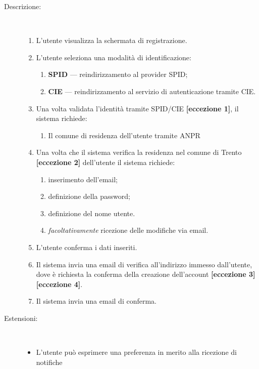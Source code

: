 \begin{ucscope}
\begin{description}
	\item[Descrizione:]~
	\begin{enumerate}
		\item L’utente visualizza la schermata di registrazione.
		\item L’utente seleziona una modalità di identificazione:
		\begin{enumerate}
			\item \textbf{SPID} — reindirizzamento al provider SPID\@;
			\item \textbf{CIE} — reindirizzamento al servizio di autenticazione tramite CIE\@.
		\end{enumerate}
		\item Una volta validata l’identità tramite SPID/CIE \textbf{[eccezione 1]}, il sistema richiede:
		\begin{enumerate}
			\item Il comune di residenza dell'utente tramite ANPR
		\end{enumerate}
		\item Una volta che il sistema verifica la residenza nel comune di Trento \textbf{[eccezione 2]} dell'utente il sistema richiede:
		\begin{enumerate}
			\item inserimento dell’email;
			\item definizione della password;
			\item definizione del nome utente.
			\item \emph{facoltativamente} ricezione delle modifiche via email.
		\end{enumerate}
		\item L’utente conferma i dati inseriti.
		\item Il sistema invia una email di verifica all'indirizzo immesso dall'utente, dove è richiesta la conferma della creazione dell'account \textbf{[eccezione 3]} \textbf{[eccezione 4]}.
		\item Il sistema invia una email di conferma.
	\end{enumerate}
	
		\item[Estensioni:]~
	\begin{itemize}
		\item[(0)] L'utente può esprimere una preferenza in merito alla ricezione di notifiche 
	\end{itemize}


\end{description}
\end{ucscope}
